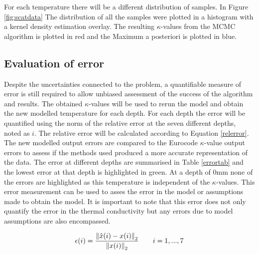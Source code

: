  For each temperature there will be a different distribution of samples. 
 In Figure \ref{fig:scatdata} The distribution of all the samples were plotted in a histogram with a kernel density estimation overlay. 
 The resulting $\kappa$-values from the MCMC algorithm is plotted in red and the Maximum a posteriori is plotted in blue.

%


\subsection{Evaluation of error}
Despite the uncertainties connected to the problem, a quantifiable measure of error is still required to allow unbiased assessment of the success of the algorithm and results.
The obtained $\kappa$-values will be used to rerun the model and obtain the new modelled temperature for each depth. 
For each depth the error will be quantified using the norm of the relative error at the seven different depths, noted as $i$.
The relative error will be calculated according to  Equation \ref{relerror}. 
The new modelled output errors are compared to the Eurocode $\kappa$-value output errors to assess if the methods used produced a more accurate representation of the data.
The error at different depths are summarised in Table \ref{errortab} and the lowest error at that depth is highlighted in green. 
At a depth of 0mm none of the errors are highlighted as this temperature is independent of the $\kappa$-values.
This error measurement can be used to asses the error in the model or assumptions made to obtain the model.
It is important to note that this error does not only quantify the error in the thermal conductivity but any errors due to model assumptions are also encompassed.

\begin{equation}\label{relerror}
\epsilon(i) = \frac{\left\lVert\hat{x}(i)-x(i) \right\rVert_2}{\left\lVert x(i)\right\rVert_2} \quad \quad i= 1, ... ,7
\end{equation}

